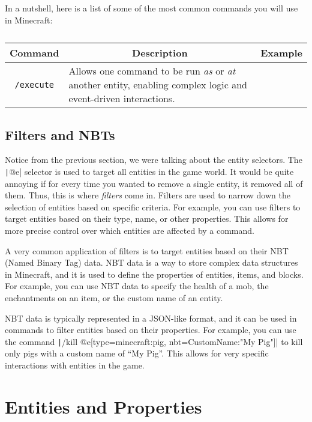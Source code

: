 In a nutshell, here is a list of some of the most common commands you will use in Minecraft:
\begin{table}[htbp]
    \centering
    \begin{tabular}{cp{6cm}p{6cm}}
        \toprule
        \textbf{Command} & \multicolumn{1}{c}{\textbf{Description}} & \multicolumn{1}{c}{\textbf{Example}} \\ \midrule
        \texttt{/execute} & Allows one command to be run \textit{as} or \textit{at} another entity, enabling complex logic and event-driven interactions.  \\
        \bottomrule
    \end{tabular}
    \caption{}\label{tab:}
\end{table} 

\subsection{Filters and NBTs}
\label{subsec:filters_and_nbts}

Notice from the previous section, we were talking about the entity selectors. The \texttt|@e| selector is used to target all entities in the game world. It would be quite annoying if for every time you wanted to remove a single entity, it removed all of them. Thus, this is where \textit{filters} come in. Filters are used to narrow down the selection of entities based on specific criteria. For example, you can use filters to target entities based on their type, name, or other properties. This allows for more precise control over which entities are affected by a command.

A very common application of filters is to target entities based on their NBT (Named Binary Tag) data. NBT data is a way to store complex data structures in Minecraft, and it is used to define the properties of entities, items, and blocks. For example, you can use NBT data to specify the health of a mob, the enchantments on an item, or the custom name of an entity.

NBT data is typically represented in a JSON-like format, and it can be used in commands to filter entities based on their properties. For example, you can use the command \texttt|/kill @e[type=minecraft:pig, nbt={CustomName:"My Pig"}]| to kill only pigs with a custom name of ``My Pig''. This allows for very specific interactions with entities in the game.

\section{Entities and Properties}
\label{sec:entities_and_properties}


